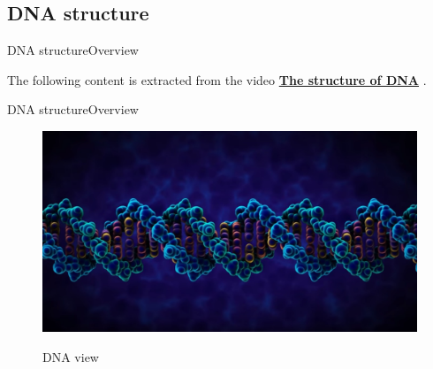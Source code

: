 \documentclass[10pt]{beamer}
\begin{document}
{\subsection{DNA structure}



\begin{frame}{DNA structure}{Overview}

\begin{block}{}
The following content is extracted from the video \href{https://www.youtube.com/watch?v=o_-6JXLYS-k}{\textbf{The structure of DNA}} \cite{yourgenome2020}.
\end{block}

\end{frame}

\begin{frame}{DNA structure}{Overview}
	\begin{figure}[]
		\centering
		\includegraphics[width=\textwidth,height=0.7\textheight,keepaspectratio]{img/introduction/dna1.jpg}
		\label{img:mot2}
		\caption{DNA view}
	\end{figure}
\end{frame}

}
\end{document}

